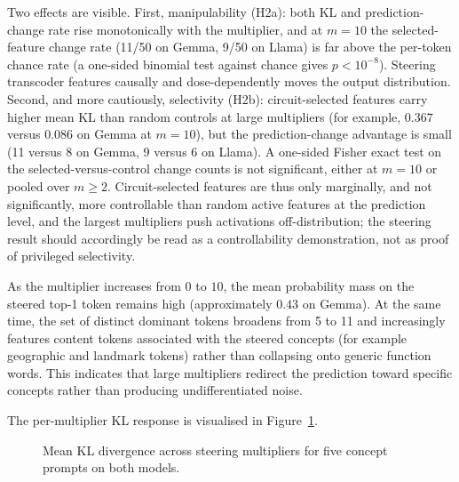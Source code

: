 Two effects are visible.  First, manipulability (H2a): both KL
and prediction-change rate rise monotonically with the multiplier, and
at $m{=}10$ the selected-feature change rate (11/50 on Gemma, 9/50 on
Llama) is far above the per-token chance rate (a one-sided binomial
test against chance gives $p<10^{-8}$).  Steering transcoder features
causally and dose-dependently moves the output distribution.
Second, and more cautiously, selectivity (H2b): circuit-selected
features carry higher mean KL than random controls at large
multipliers (for example, $0.367$ versus $0.086$ on Gemma at $m{=}10$), but the
prediction-change advantage is small (11 versus 8 on Gemma, 9
versus 6 on Llama).  A one-sided Fisher exact test on the
selected-versus-control change counts is not significant, either at
$m{=}10$ or pooled over $m\geq 2$.  Circuit-selected features are thus only
marginally, and not significantly, more controllable than random
active features at the prediction level, and the largest
multipliers push activations off-distribution; the steering result
should accordingly be read as a controllability demonstration, not as proof of
privileged selectivity.

 As
the multiplier increases from $0$ to $10$, the mean probability mass on
the steered top-1 token remains high (approximately $0.43$ on Gemma).
At the same time, the set of distinct dominant tokens broadens from 5 to 11 and
increasingly features content tokens associated with the steered
concepts (for example geographic and landmark tokens) rather than
collapsing onto generic function words. This indicates that large
multipliers redirect the prediction toward specific concepts rather than
producing undifferentiated noise.

The per-multiplier KL response is visualised in
Figure~\ref{fig:steering}.

\begin{figure}[H]
\centering

\caption{Mean KL divergence across steering multipliers for five
concept prompts on both models.}
\label{fig:steering}
\end{figure}

